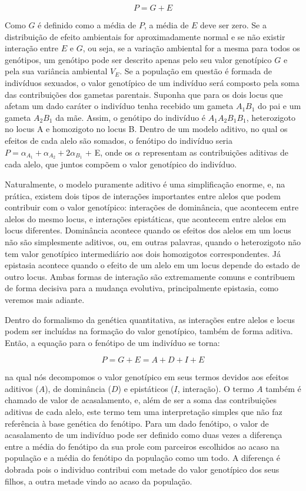 \begin{refsection}
\begin{equation}
P = G + E
\end{equation}

Como $G$ é definido como a média de $P$, a média de $E$ deve ser zero. Se a
distribuição de efeito ambientais for aproximadamente normal e se não existir
interação entre $E$ e $G$, ou seja, se a variação ambiental for a mesma para
todos os genótipos, um genótipo pode ser descrito apenas pelo seu valor
genotípico $G$ e pela sua variância ambiental $V_E$. Se a população em questão
é formada de indivíduos sexuados, o valor genotípico de um indivíduo será
composto pela soma das contribuições dos gametas parentais. Suponha que para os dois
locus que afetam um dado caráter o indivíduo tenha recebido um gameta $A_1B_1$
do pai e um gameta $A_2B_1$ da mãe. Assim, o genótipo do indivíduo é
$A_1A_2B_1B_1$, heterozigoto no locus A e homozigoto no locus B. Dentro de um
modelo aditivo, no qual os efeitos de cada alelo são somados, o fenótipo do
indivíduo seria $P = \alpha_{A_1} + \alpha_{A_2} + 2\alpha_{B_1}$ + E, onde os
$\alpha$ representam as contribuições aditivas de cada alelo, que juntos
compõem o valor genotípico do indivíduo. 

Naturalmente, o modelo puramente aditivo é uma simplificação enorme, e, na
prática, existem dois tipos de interações importantes entre alelos que podem
contribuir com o valor genotípico: interações de dominância, que acontecem
entre alelos do mesmo locus, e interações epistáticas, que acontecem entre
alelos em locus diferentes. Dominância acontece quando os efeitos dos alelos
em um locus não são simplesmente aditivos, ou, em outras palavras, quando o
heterozigoto não tem valor genotípico intermediário aos dois homozigotos
correspondentes. Já epistasia acontece quando o efeito de um alelo em um locus
depende do estado de outro locus. Ambas formas de interação são extremamente
comuns e contribuem de forma decisiva para a mudança evolutiva, principalmente
epistasia, como veremos mais adiante.

Dentro do formalismo da genética quantitativa, as interações entre alelos e
locus podem ser incluídas na formação do valor genotípico, também de forma
aditiva. Então, a equação para o fenótipo de um indivíduo se torna:

\begin{equation}
P = G + E = A + D + I + E
\end{equation}

na qual nós decompomos o valor genotípico em seus termos devidos aos efeitos
aditivos ($A$), de dominância ($D$) e epistáticos ($I$, interação). O termo
$A$ também é chamado de valor de acasalamento, e, além de ser a soma das
contribuições aditivas de cada alelo, este termo tem uma interpretação simples
que não faz referência à base genética do fenótipo. Para um dado fenótipo, o
valor de acasalamento de um indivíduo pode ser definido como duas vezes a
diferença entre a média do fenótipo da sua prole com parceiros escolhidos ao
acaso na população e a média do fenótipo da população como um todo. A
diferença é dobrada pois o individuo contribui com metade do valor genotípico
dos seus filhos, a outra metade vindo ao acaso da população.


\end{refsection}
